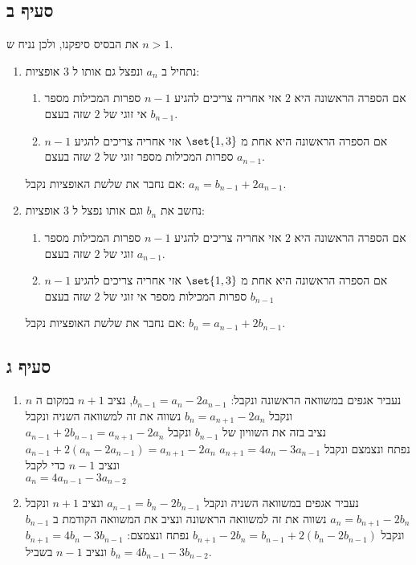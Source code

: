 \documentclass{article}
\DeclarePairedDelimiter\set\{\}
\begin{document}
	\subsection*{סעיף ב}
	את הבסיס סיפקנו, ולכן נניח ש $n > 1$.
	\begin{enumerate}
		\item נתחיל ב $a_n$ ונפצל גם אותו ל 3 אופציות:
		\begin{enumerate}
			\item אם הספרה הראשונה היא $2$ אזי אחריה צריכים להגיע $n-1$ ספרות המכילות מספר אי זוגי של $2$ שזה בעצם $b_{n-1}$.
			\item אם הספרה הראשונה היא אחת מ $\set{1,3}$ אזי אחריה צריכים להגיע $n-1$ ספרות המכילות מספר זוגי של $2$ שזה בעצם $a_{n-1}$.
		\end{enumerate}
		אם נחבר את שלשת האופציות נקבל: $a_n = b_{n-1} + 2a_{n-1}$.

		\item נחשב את $b_n$ וגם אותו נפצל ל 3 אופציות:
		\begin{enumerate}
			\item אם הספרה הראשונה היא $2$ אזי אחריה צריכים להגיע $n-1$ ספרות המכילות מספר זוגי של $2$ שזה בעצם $a_{n-1}$.
			\item אם הספרה הראשונה היא אחת מ $\set{1,3}$ אזי אחריה צריכים להגיע $n-1$ ספרות המכילות מספר אי זוגי של $2$ שזה בעצם $b_{n-1}$
		\end{enumerate}
		אם נחבר את שלשת האופציות נקבל: $b_n = a_{n-1} + 2b_{n-1}$.
	\end{enumerate}

	\subsection*{סעיף ג}
	\begin{enumerate}
		\item נעביר אגפים במשוואה הראשונה ונקבל: $b_{n-1} = a_n - 2a_{n-1}$, נציב $n+1$ במקום ה $n$ ונקבל $b_n = a_{n+1} - 2a_n$ נשווה את זה למשוואה השניה ונקבל \\
		$a_{n-1} + 2b_{n-1} = a_{n+1} - 2a_n$
		 נציב בזה את השוויון של $b_{n-1}$ ונקבל \\
		 $a_{n-1} + 2(a_n - 2a_{n-1}) = a_{n+1} - 2a_n$ נפתח ונצמצם ונקבל $a_{n+1} = 4a_n - 3a_{n-1}$ ונציב $n-1$ כדי לקבל \\
		 $\boxed{a_n = 4a_{n-1} - 3a_{n-2}}$

		 \item נעביר אגפים במשוואה השניה ונקבל $a_{n-1} = b_n - 2b_{n-1}$ ונציב $n+1$ ונקבל $a_n = b_{n+1} - 2b_n$ נשווה את זה למשוואה הראשונה ונציב את המשוואה הקודמת ב $b_{n-1}$
		 ונקבל $b_{n+1} - 2b_n = b_{n-1} + 2(b_n - 2 b_{n-1})$ נפתח ונצמצם: $b_{n+1} = 4b_n - 3b_{n-1}$ ונציב $n-1$ בשביל $\boxed{b_n = 4b_{n-1} - 3b_{n-2}}$.
	\end{enumerate}
\end{document}
